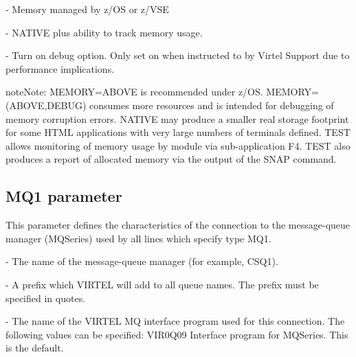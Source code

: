 \documentclass[letterpaper,10pt,english]{sphinxmanual}
\begin{document}
 - Memory managed by z/OS or z/VSE

 - NATIVE plus ability to track memory usage.

 - Turn on debug option. Only set on when instructed to by Virtel Support due to performance implications.

\begin{sphinxadmonition}{note}{Note:}
MEMORY=ABOVE is recommended under z/OS. MEMORY=(ABOVE,DEBUG) consumes more resources and is intended for debugging of memory corruption errors. NATIVE may produce a smaller real storage footprint for some HTML applications with very large numbers of terminals defined. TEST allows monitoring of memory usage by module via sub-application F4. TEST also produces a report of allocated memory via the output of the SNAP command.
\end{sphinxadmonition}

\ignorespaces 

\subsection{MQ1 parameter}
\label{\detokenize{Installation_Guide:mq1-parameter}}\label{\detokenize{Installation_Guide:index-91}}
\begin{sphinxVerbatim}[commandchars=\\\{\}]
\PYG{p}{[}\PYG{p}{]}           
\end{sphinxVerbatim}

This parameter defines the characteristics of the connection to the message-queue manager (MQSeries) used by all lines which specify type MQ1.

 - The name of the message-queue manager (for example, CSQ1).

 - A prefix which VIRTEL will add to all queue names. The prefix must be specified in quotes.

 - The name of the VIRTEL MQ interface program used for this connection. The following values can be specified: VIR0Q09 Interface program for MQSeries. This is the default.
\end{document}
